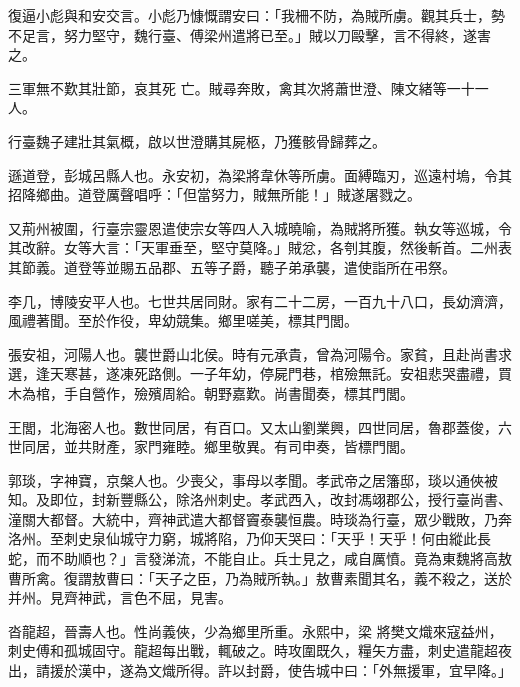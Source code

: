 \begin{pinyinscope}
 復逼小彪與和安交言。小彪乃慷慨謂安曰：「我柵不防，為賊所虜。觀其兵士，勢不足言，努力堅守，魏行臺、傅梁州遣將已至。」賊以刀毆擊，言不得終，遂害之。



 三軍無不歎其壯節，哀其死
 亡。賊尋奔敗，禽其次將蕭世澄、陳文緒等一十一人。



 行臺魏子建壯其氣概，啟以世澄購其屍柩，乃獲骸骨歸葬之。



 遜道登，彭城呂縣人也。永安初，為梁將韋休等所虜。面縛臨刃，巡遠村塢，令其招降鄉曲。道登厲聲唱呼：「但當努力，賊無所能！」賊遂屠戮之。



 又荊州被圍，行臺宗靈恩遣使宗女等四人入城曉喻，為賊將所獲。執女等巡城，令其改辭。女等大言：「天軍垂至，堅守莫降。」賊忿，各刳其腹，然後斬首。二州表其節義。道登等並賜五品郡、五等子爵，聽子弟承襲，遣使詣所在弔祭。



 李几，博陵安平人也。七世共居同財。家有二十二房，一百九十八口，長幼濟濟，風禮著聞。至於作役，卑幼競集。鄉里嗟美，標其門閭。



 張安祖，河陽人也。襲世爵山北侯。時有元承貴，曾為河陽令。家貧，且赴尚書求選，逢天寒甚，遂凍死路側。一子年幼，停屍門巷，棺殮無託。安祖悲哭盡禮，買木為棺，手自營作，殮殯周給。朝野嘉歎。尚書聞奏，標其門閭。



 王閭，北海密人也。數世同居，有百口。又太山劉業興，四世同居，魯郡蓋俊，六世同居，並共財產，家門雍睦。鄉里敬異。有司申奏，皆標門閭。



 郭琰，字神寶，京槃人也。少喪父，事母以孝聞。孝武帝之居籓邸，琰以通俠被知。及即位，封新豐縣公，除洛州刺史。孝武西入，改封馮翊郡公，授行臺尚書、潼關大都督。大統中，齊神武遣大都督竇泰襲恒農。時琰為行臺，眾少戰敗，乃奔洛州。至刺史泉仙城守力窮，城將陷，乃仰天哭曰：「天乎！天乎！何由縱此長蛇，而不助順也？」言發涕流，不能自止。兵士見之，咸自厲憤。竟為東魏將高敖曹所禽。復謂敖曹曰：「天子之臣，乃為賊所執。」敖曹素聞其名，義不殺之，送於并州。見齊神武，言色不屈，見害。



 沓龍超，晉壽人也。性尚義俠，少為鄉里所重。永熙中，梁
 將樊文熾來寇益州，刺史傅和孤城固守。龍超每出戰，輒破之。時攻圍既久，糧矢方盡，刺史遣龍超夜出，請援於漢中，遂為文熾所得。許以封爵，使告城中曰：「外無援軍，宜早降。」




\end{pinyinscope}
